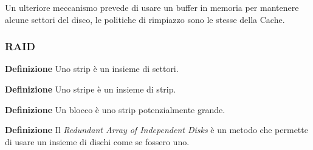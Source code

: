 \documentclass{article}
\begin{document}
\noindent Un ulteriore meccanismo prevede di usare un buffer in memoria per mantenere alcune settori del disco, le politiche di rimpiazzo sono le stesse della Cache.\newline

\subsubsection{RAID}

\textbf{Definizione} Uno strip è un insieme di settori.\newline

\noindent\textbf{Definizione} Uno stripe è un insieme di strip.\newline

\noindent\textbf{Definizione} Un blocco è uno strip potenzialmente grande.\newline

\noindent\textbf{Definizione} Il \textit{Redundant Array of Independent Disks} è un metodo che permette di usare un insieme di dischi come se fossero uno.

\newpage
\end{document}
